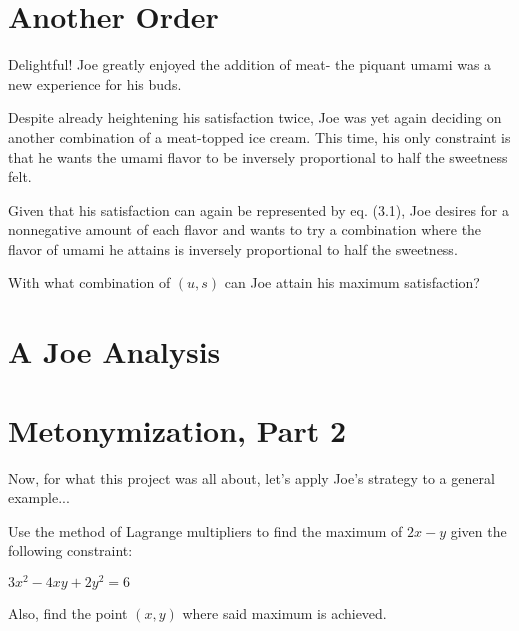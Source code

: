 \setcounter{chapter}{5}
\chapter{Another Order} %
Delightful! Joe greatly enjoyed the addition of meat- the piquant umami was a new experience for his buds.

Despite already heightening his satisfaction twice, Joe was yet again deciding on another combination of a meat-topped ice cream.
This time, his only constraint is that he wants the umami flavor to be inversely proportional to half the sweetness felt.
\begin{eg} %
	Given that his satisfaction can again be represented by eq. (3.1), Joe desires for a nonnegative amount of each flavor and wants to try a combination where the flavor of umami he attains is inversely proportional to half the sweetness.

	With what combination of $(u, s)$ can Joe attain his maximum satisfaction?
\end{eg}
\setcounter{chapter}{6}
\chapter{A Joe Analysis}
\setcounter{chapter}{7}
\chapter{Metonymization, Part 2} %
Now, for what this project was all about, let's apply Joe's strategy to a general example...
\begin{eg}
	Use the method of Lagrange multipliers to find the maximum of $2x-y$ given the following constraint:
	\begin{center}
		$3x^2-4xy+2y^2=6$
	\end{center}
	Also, find the point $(x, y)$ where said maximum is achieved.
\end{eg}
